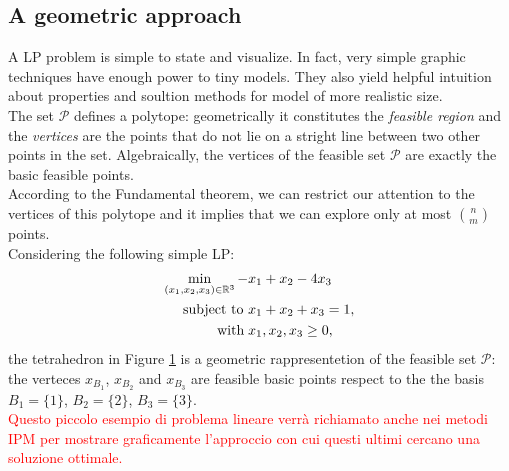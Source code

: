 \documentclass[a4paper,10 pt,titlepage,twoside]{book}
\theoremstyle{plain}
\theoremstyle{definition}
\theoremstyle{remark}
\begin{document}
\subsection*{A geometric approach}
A LP problem is simple to state and visualize. In fact, very simple graphic techniques have enough power to tiny models. They also yield helpful intuition about properties and soultion methods for model of more realistic size.\\ The set $\mathcal{P}$ defines a polytope: geometrically it constitutes the \textit{feasible region} and the \textit{vertices} are the points that do not lie on a stright line between two other points in the set. Algebraically, the vertices of the feasible set $\mathcal{P}$ are exactly the basic feasible points.\\ According to the Fundamental theorem, we can restrict our attention to the vertices of this polytope and it implies that we can explore only at most  ${n}\choose{m}$ points.\\[0.5cm]
Considering the following simple LP:
\begin{align*}
\min\limits_{(x_{1},x_{2},x_{3})\in\mathbb{R}^{3}} -&x_{1}+ x_{2}-4x_{3}\\
\text{subject to }&x_{1}+x_{2}+x_{3}=1,\\
 \text{\; with\;} &x_{1}, x_{2}, x_{3} \geq 0,
\end{align*}
the tetrahedron in Figure \ref{tetra} is a geometric rappresentetion of the feasible set $\mathcal{P}$: the verteces ${x}_{B_{1}}$, ${x}_{B_{2}}$ and ${x}_{B_{3}}$ are feasible basic points respect to the the basis $B_{1} =\{1\}$,  $B_{2} =\{2\}$,  $B_{3} =\{3\}$.\\
\textcolor{red}{Questo piccolo esempio di problema lineare verrà richiamato anche nei metodi IPM per mostrare graficamente l'approccio con cui questi ultimi cercano una soluzione ottimale.}
\begin{figure}[h]\caption{\label{tetra}}
\begin{center}
\end{center}
\end{figure}
\end{document}
